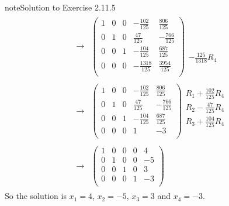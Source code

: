 \documentclass[letterpaper,10pt,english]{jupyterBook}
\begin{document}
\begin{sphinxadmonition}{note}{Solution to Exercise 2.11.5}
\begin{equation*}
\begin{split}
\begin{align*}
    \longrightarrow 
    & \left( \begin{array}{cccc|c} 
         1 & 0 & 0 & - \frac{102}{125} & \frac{806}{125} \\ 
         0 & 1 & 0 & \frac{47}{125} & - \frac{766}{125} \\ 
         0 & 0 & 1 & - \frac{104}{125} & \frac{687}{125} \\ 
         0 & 0 & 0 & - \frac{1318}{125} & \frac{3954}{125} \\ 
    \end{array} \right) 
    \begin{array}{l} \phantom{x} \\ \phantom{x} \\ \phantom{x} \\ - \frac{125}{1318} R_{4}\end{array} \\ \\ 
    \longrightarrow 
    & \left( \begin{array}{cccc|c} 
         1 & 0 & 0 & - \frac{102}{125} & \frac{806}{125} \\ 
         0 & 1 & 0 & \frac{47}{125} & - \frac{766}{125} \\ 
         0 & 0 & 1 & - \frac{104}{125} & \frac{687}{125} \\ 
         0 & 0 & 0 & 1 & -3 \\ 
    \end{array} \right) 
    \begin{array}{l} R_{1} + \frac{102}{125} R_{4}\\ R_{2} - \frac{47}{125} R_{4} \\ R_{3} + \frac{104}{125} R_{4}\\ \phantom{x} \end{array} \\ \\ 
    \longrightarrow 
    & \left( \begin{array}{cccc|c} 
         1 & 0 & 0 & 0 & 4 \\ 
         0 & 1 & 0 & 0 & -5 \\ 
         0 & 0 & 1 & 0 & 3 \\ 
         0 & 0 & 0 & 1 & -3 \\ 
    \end{array} \right) 
\end{align*} \end{split}
\end{equation*}
\sphinxAtStartPar
So the solution is \(x_{1} = 4\), \(x_{2} = -5\), \(x_{3} = 3\) and \(x_{4} = -3\).


\end{sphinxadmonition}
\end{document}
